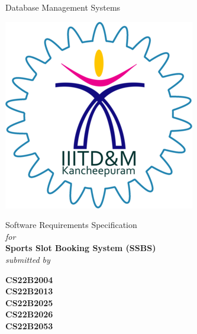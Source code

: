 \documentclass[12pt]{article}
\begin{document}
\large

\newpage

\date{}

\vspace*{10pt}
\begin{center}
{\Huge Database Management Systems} \\[40pt]
\begin{center}
    \includegraphics[width=0.5\linewidth]{logo.png}    
\end{center}

{\LARGE Software Requirements Specification} \\[15pt]
\textit{\large for} \\[15pt]
\textbf{\LARGE Sports Slot Booking System (SSBS)} \\[15pt]
\textit{\large submitted by} \\[25pt]
\end{center}
\hspace{2.2cm}{\Large Vignesh Aravindh B} \hspace{1cm} \textbf{\Large CS22B2004} \\[10pt]
\hspace*{2.2cm}{\Large Rajvardhan G} \hspace{2.505cm} \textbf{\Large CS22B2013} \\[10pt]
\hspace*{2.2cm}{\Large Ashrith G} \hspace{3.53cm} \textbf{\Large CS22B2025} \\[10pt]
\hspace*{2.2cm}{\Large P Veeresh Kumar} \hspace{1.725cm} \textbf{\Large CS22B2026} \\[10pt]
\hspace*{2.2cm}{\Large Dhivya Dharshan V} \hspace{1.185cm} \textbf{\Large CS22B2053}
\end{document}
